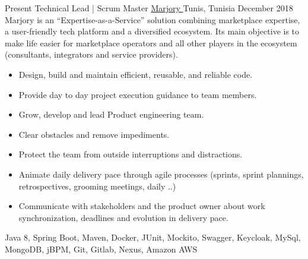 %
%
%
\begin{experiences}
  \experience
    {Present}       
    {Technical Lead | Scrum Master}
    {\href{https://marjory.io}{Marjory \faExternalLink}} 
    {Tunis, Tunisia}
    {December 2018}      
    {Marjory is an “Expertise-as-a-Service” solution combining marketplace expertise, a user-friendly tech platform and a diversified ecosystem. Its main objective is to make life easier for marketplace operators and all other players in the ecosystem (consultants, integrators and service providers).}
    {
      \begin{itemize}
      \item Design, build and maintain efficient, reusable, and reliable code.
        \item Provide day to day project execution guidance to team members.
        \item Grow, develop and lead Product engineering team.
        \item Clear obstacles and remove impediments.
        \item Protect the team from outside interruptions and distractions.
        \item Animate daily delivery pace through agile processes (sprints, sprint plannings, retrospectives, grooming meetings, daily ..)
        \item Communicate with stakeholders and the product owner about work synchronization, deadlines and evolution in delivery pace.
      \end{itemize}
    }
    {Java 8, Spring Boot, Maven, Docker, JUnit, Mockito, Swagger, Keycloak, MySql, MongoDB, jBPM, Git, Gitlab, Nexus, Amazon AWS}
    

\end{experiences}
